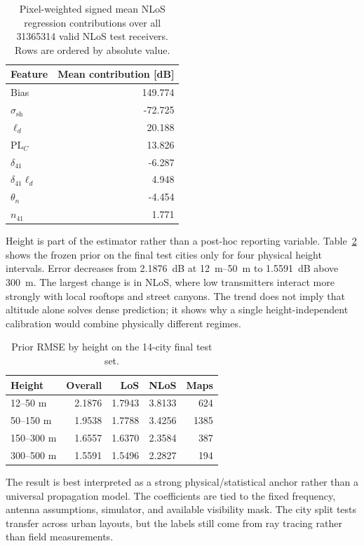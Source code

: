 \documentclass[10pt,conference]{IEEEtran}
\begin{document}
\begin{table}[t]
\centering
\caption{Pixel-weighted signed mean NLoS regression contributions over all
\num{31365314} valid NLoS test receivers. Rows are ordered by absolute value.}
\label{tab:nlos-applied-terms}
\scriptsize
\setlength{\tabcolsep}{8pt}
\begin{tabular}{lr}
\toprule
Feature & Mean contribution [dB] \\
\midrule
Bias & 149.774 \\
$\sigma_{\mathrm{sh}}$ & -72.725 \\
$\ell_d$ & 20.188 \\
$\mathrm{PL}_{C}$ & 13.826 \\
$\delta_{41}$ & -6.287 \\
$\delta_{41}\ell_d$ & 4.948 \\
$\theta_n$ & -4.454 \\
$n_{41}$ & 1.771 \\
\bottomrule
\end{tabular}
\end{table}

Height is part of the estimator rather than a post-hoc reporting variable.
Table~\ref{tab:height} shows the frozen prior on the final test cities only
for four physical height intervals. Error decreases from
\SI{2.1876}{dB} at \SIrange{12}{50}{m} to \SI{1.5591}{dB} above \SI{300}{m}.
The largest change is in NLoS, where low transmitters interact more strongly
with local rooftops and street canyons. The trend does not imply that altitude
alone solves dense prediction; it shows why a single height-independent
calibration would combine physically different regimes.

\begin{table}[t]
\centering
\caption{Prior RMSE by height on the 14-city final test set.}
\label{tab:height}
\scriptsize
\setlength{\tabcolsep}{3.2pt}
\begin{tabular}{lrrrr}
\toprule
Height & Overall & LoS & NLoS & Maps \\
\midrule
12--50 m & 2.1876 & 1.7943 & 3.8133 & 624 \\
50--150 m & 1.9538 & 1.7788 & 3.4256 & 1385 \\
150--300 m & 1.6557 & 1.6370 & 2.3584 & 387 \\
300--500 m & 1.5591 & 1.5496 & 2.2827 & 194 \\
\bottomrule
\end{tabular}
\end{table}

The result is best interpreted as a strong physical/statistical anchor rather
than a universal propagation model. The coefficients are tied to the fixed
frequency, antenna assumptions, simulator, and available visibility mask. The
city split tests transfer across urban layouts, but the labels still come from
ray tracing rather than field measurements.
\end{document}
